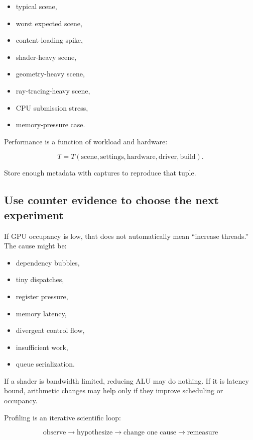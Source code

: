 \begin{itemize}
\tightlist
\item
  typical scene,
\item
  worst expected scene,
\item
  content-loading spike,
\item
  shader-heavy scene,
\item
  geometry-heavy scene,
\item
  ray-tracing-heavy scene,
\item
  CPU submission stress,
\item
  memory-pressure case.
\end{itemize}

Performance is a function of workload and hardware:

\[
T = T(\text{scene},\text{settings},\text{hardware},\text{driver},\text{build}).
\]

Store enough metadata with captures to reproduce that tuple.

\subsection{Use counter evidence to choose the next experiment}\label{05-engine-i-ch008-use-counter-evidence-to-choose-the-next-experiment}

If GPU occupancy is low, that does not automatically mean ``increase threads.'' The cause might be:

\begin{itemize}
\tightlist
\item
  dependency bubbles,
\item
  tiny dispatches,
\item
  register pressure,
\item
  memory latency,
\item
  divergent control flow,
\item
  insufficient work,
\item
  queue serialization.
\end{itemize}

If a shader is bandwidth limited, reducing ALU may do nothing. If it is latency bound, arithmetic changes may help only if they improve scheduling or occupancy.

Profiling is an iterative scientific loop:

\[
\boxed{
\text{observe}
\rightarrow
\text{hypothesize}
\rightarrow
\text{change one cause}
\rightarrow
\text{remeasure}
}
\]

